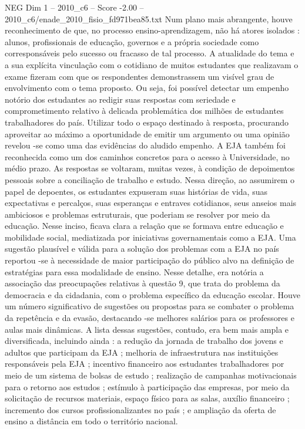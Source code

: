 \begin{textsample}{NEG Dim 1 – 2010\_c6 – Score -2.00 – 2010\_c6/enade\_2010\_fisio\_fd971bea85.txt}
Num plano mais abrangente, houve reconhecimento de que, no processo ensino-aprendizagem, não há atores isolados : alunos, profissionais de educação, governos e a própria sociedade como corresponsáveis pelo sucesso ou fracasso de tal processo.
A atualidade do tema e a sua explícita vinculação com o cotidiano de muitos estudantes que realizavam o exame fizeram com que os respondentes demonstrassem um visível grau de envolvimento com o tema proposto.
Ou seja, foi possível detectar um empenho notório dos estudantes ao redigir suas respostas com seriedade e comprometimento relativo à delicada problemática dos milhões de estudantes trabalhadores do país.
Utilizar todo o espaço destinado à resposta, procurando aproveitar ao máximo a oportunidade de emitir um argumento ou uma opinião revelou -se como uma das evidências do aludido empenho.
A EJA também foi reconhecida como um dos caminhos concretos para o acesso à Universidade, no médio prazo.
As respostas se voltaram, muitas vezes, à condição de depoimentos pessoais sobre a conciliação de trabalho e estudo.
Nessa direção, ao assumirem o papel de depoentes, os estudantes expuseram suas histórias de vida, suas expectativas e percalços, suas esperanças e entraves cotidianos, seus anseios mais ambiciosos e problemas estruturais, que poderiam se resolver por meio da educação.
Nesse inciso, ficava clara a relação que se formava entre educação e mobilidade social, mediatizada por iniciativas governamentais como a EJA.
Uma sugestão plausível e válida para a solução dos problemas com a EJA no país reportou -se à necessidade de maior participação do público alvo na definição de estratégias para essa modalidade de ensino.
Nesse detalhe, era notória a associação das preocupações relativas à questão 9, que trata do problema da democracia e da cidadania, com o problema específico da educação escolar.
Houve um número significativo de sugestões ou propostas para se combater o problema da repetência e da evasão, destacando -se melhores salários para os professores e aulas mais dinâmicas.
A lista dessas sugestões, contudo, era bem mais ampla e diversificada, incluindo ainda : a redução da jornada de trabalho dos jovens e adultos que participam da EJA ; melhoria de infraestrutura nas instituições responsáveis pela EJA ; incentivo financeiro aos estudantes trabalhadores por meio de um sistema de bolsas de estudo ; realização de campanhas motivacionais para o retorno aos estudos ; estímulo à participação das empresas, por meio da solicitação de recursos materiais, espaço físico para as salas, auxílio financeiro ; incremento dos cursos profissionalizantes no país ; e ampliação da oferta de ensino a distância em todo o território nacional.

\end{textsample}
